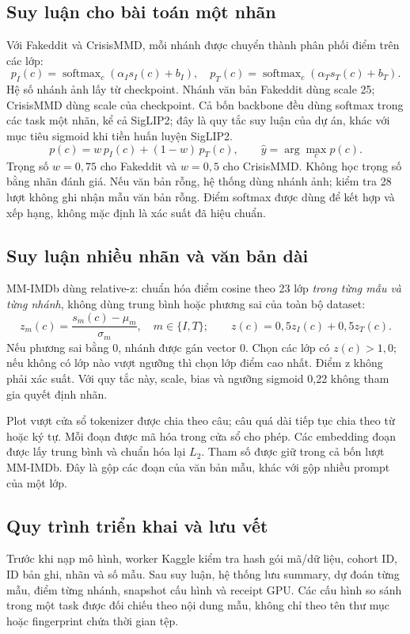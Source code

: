 \documentclass[12pt,a4paper]{article}
\begin{document}
\subsection{Suy luận cho bài toán một nhãn}
Với Fakeddit và CrisisMMD, mỗi nhánh được chuyển thành phân phối điểm trên các lớp:
\begin{equation}
p_I(c)=\operatorname{softmax}_c(\alpha_I s_I(c)+b_I),\quad
p_T(c)=\operatorname{softmax}_c(\alpha_T s_T(c)+b_T).
\end{equation}
Hệ số nhánh ảnh lấy từ checkpoint. Nhánh văn bản Fakeddit dùng scale 25; CrisisMMD dùng scale của checkpoint. Cả bốn backbone đều dùng softmax trong các task một nhãn, kể cả SigLIP2; đây là quy tắc suy luận của dự án, khác với mục tiêu sigmoid khi tiền huấn luyện SigLIP2.
\begin{equation}
p(c)=w\,p_I(c)+(1-w)\,p_T(c),\qquad \hat y=\arg\max_c p(c).
\end{equation}
Trọng số $w=0,75$ cho Fakeddit và $w=0,5$ cho CrisisMMD. Không học trọng số bằng nhãn đánh giá. Nếu văn bản rỗng, hệ thống dùng nhánh ảnh; kiểm tra 28 lượt không ghi nhận mẫu văn bản rỗng. Điểm softmax được dùng để kết hợp và xếp hạng, không mặc định là xác suất đã hiệu chuẩn.

\subsection{Suy luận nhiều nhãn và văn bản dài}
MM-IMDb dùng relative-z: chuẩn hóa điểm cosine theo 23 lớp \emph{trong từng mẫu và từng nhánh}, không dùng trung bình hoặc phương sai của toàn bộ dataset:
\begin{equation}
z_m(c)=\frac{s_m(c)-\mu_m}{\sigma_m},\quad m\in\{I,T\};\qquad
z(c)=0,5z_I(c)+0,5z_T(c).
\end{equation}
Nếu phương sai bằng 0, nhánh được gán vector 0. Chọn các lớp có $z(c)>1,0$; nếu không có lớp nào vượt ngưỡng thì chọn lớp điểm cao nhất. Điểm z không phải xác suất. Với quy tắc này, scale, bias và ngưỡng sigmoid 0,22 không tham gia quyết định nhãn.

Plot vượt cửa sổ tokenizer được chia theo câu; câu quá dài tiếp tục chia theo từ hoặc ký tự. Mỗi đoạn được mã hóa trong cửa sổ cho phép. Các embedding đoạn được lấy trung bình và chuẩn hóa lại $L_2$. Tham số  được giữ trong cả bốn lượt MM-IMDb. Đây là gộp các đoạn của văn bản mẫu, khác với gộp nhiều prompt của một lớp.

\subsection{Quy trình triển khai và lưu vết}
Trước khi nạp mô hình, worker Kaggle kiểm tra hash gói mã/dữ liệu, cohort ID, ID bản ghi, nhãn và số mẫu. Sau suy luận, hệ thống lưu summary, dự đoán từng mẫu, điểm từng nhánh, snapshot cấu hình và receipt GPU. Các cấu hình so sánh trong một task được đối chiếu theo nội dung mẫu, không chỉ theo tên thư mục hoặc fingerprint chứa thời gian tệp.
\end{document}
